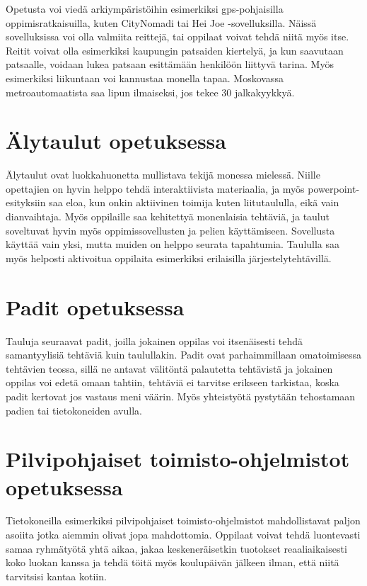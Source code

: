 \documentclass[utf8,bachelor]{gradu3}
\begin{document}
Opetusta voi viedä arkiympäristöihin esimerkiksi gps-pohjaisilla oppimisratkaisuilla, kuten CityNomadi tai Hei Joe -sovelluksilla. Näissä sovelluksissa voi olla valmiita reittejä, tai oppilaat voivat tehdä niitä myös itse. Reitit voivat olla esimerkiksi kaupungin patsaiden kiertelyä, ja kun saavutaan patsaalle, voidaan lukea patsaan esittämään henkilöön liittyvä tarina. Myös esimerkiksi liikuntaan voi kannustaa monella tapaa. Moskovassa metroautomaatista saa lipun ilmaiseksi, jos tekee 30 jalkakyykkyä.


\section{Älytaulut opetuksessa}
Älytaulut ovat luokkahuonetta mullistava tekijä monessa mielessä. Niille opettajien on hyvin helppo tehdä interaktiivista materiaalia, ja myös powerpoint-esityksiin saa eloa, kun onkin aktiivinen toimija kuten liitutaululla, eikä vain dianvaihtaja. Myös oppilaille saa kehitettyä monenlaisia tehtäviä, ja taulut soveltuvat hyvin myös oppimissovellusten ja pelien käyttämiseen. Sovellusta käyttää vain yksi, mutta muiden on helppo seurata tapahtumia. Taululla saa myös helposti aktivoitua oppilaita esimerkiksi erilaisilla järjestelytehtävillä.

\section{Padit opetuksessa}
Tauluja seuraavat padit, joilla jokainen oppilas voi itsenäisesti tehdä samantyylisiä tehtäviä kuin taulullakin. Padit ovat parhaimmillaan omatoimisessa tehtävien teossa, sillä ne antavat välitöntä palautetta tehtävistä ja jokainen oppilas voi edetä omaan tahtiin, tehtäviä ei tarvitse erikseen tarkistaa, koska padit kertovat jos vastaus meni väärin. Myös yhteistyötä pystytään tehostamaan padien tai tietokoneiden avulla.

\section{Pilvipohjaiset toimisto-ohjelmistot opetuksessa}
Tietokoneilla esimerkiksi pilvipohjaiset toimisto-ohjelmistot mahdollistavat paljon asoiita jotka aiemmin olivat jopa mahdottomia. Oppilaat voivat tehdä luontevasti samaa ryhmätyötä yhtä aikaa, jakaa keskeneräisetkin tuotokset reaaliaikaisesti koko luokan kanssa ja tehdä töitä myös koulupäivän jälkeen ilman, että niitä tarvitsisi kantaa kotiin.
\end{document}
